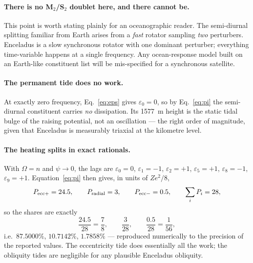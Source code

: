 \documentclass[11pt]{article}
\newcommand{\Om}{\Omega}
\begin{document}
\paragraph{There is no M$_2$/S$_2$ doublet here, and there cannot be.} This
point is worth stating plainly for an oceanographic reader. The semi-diurnal
splitting familiar from Earth arises from a \emph{fast} rotator sampling
\emph{two} perturbers. Enceladus is a slow synchronous rotator with one
dominant perturber; everything time-variable happens at a single frequency.
Any ocean-response model built on an Earth-like constituent list will be
mis-specified for a synchronous satellite.

\paragraph{The permanent tide does no work.} At exactly zero frequency,
Eq.~\eqref{eq:eps} gives $\varepsilon_0=0$, so by Eq.~\eqref{eq:pi} the
semi-diurnal constituent carries \emph{no} dissipation. Its 1577~m height is
the static tidal bulge of the raising potential, not an oscillation --- the
right order of magnitude, given that Enceladus is measurably triaxial at the
kilometre level.

\paragraph{The heating splits in exact rationals.} With $\Om=n$ and
$\psi\to0$, the lags are $\varepsilon_0=0$, $\varepsilon_1=-1$,
$\varepsilon_2=+1$, $\varepsilon_5=+1$, $\varepsilon_8=-1$,
$\varepsilon_9=+1$. Equation~\eqref{eq:pi} then gives, in units of $Ze^2/8$,
\begin{equation}
  P_{\rm ecc+} = 24.5, \qquad
  P_{\rm radial} = 3, \qquad
  P_{\rm ecc-} = 0.5, \qquad
  \sum_i P_i = 28,
\end{equation}
so the shares are exactly
\begin{equation}
  \frac{24.5}{28} = \frac{7}{8}, \qquad
  \frac{3}{28}, \qquad
  \frac{0.5}{28} = \frac{1}{56},
\end{equation}
i.e.\ $87.5000\%$, $10.7142\%$, $1.7858\%$ --- reproduced numerically to the
precision of the reported values. The eccentricity tide does essentially all
the work; the obliquity tides are negligible for any plausible Enceladus
obliquity.
\end{document}
